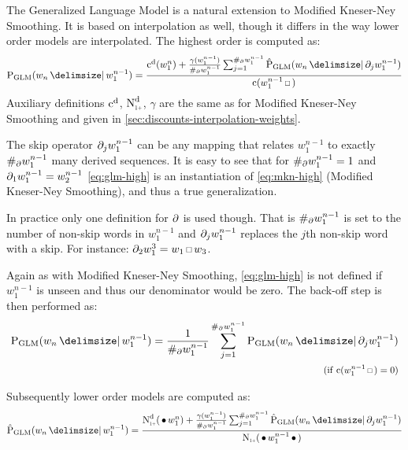 The Generalized Language Model is a natural extension to Modified Kneser-Ney
Smoothing.
It is based on interpolation as well, though it differs in the way lower order
models are interpolated.
The highest order is computed as:
\begin{equation}
  \label{eq:glm-high}
  \ProbGLM{w_n}{w_1^{n-1}} =
    \frac{\DiscountedCount(w_1^n) + \frac{\gamma(w_1^{n-1})}{\NumSkpOp{w_1^{n-1}}}
                                    \sum_{j=1}^{\NumSkpOp{w_1^{n-1}}} \ProbGLM*{w_n}{\SkpOp[j]{w_1^{n-1}}}}
         {\Count(w_1^{n-1} \Skp)}
\end{equation}
Auxiliary definitions $\DiscountedCount$, $\DiscountedCount*$, $\gamma$ are the
same as for Modified Kneser-Ney Smoothing and given in
\cref{sec:discounts-interpolation-weights}.

The skip operator $\SkpOp[j]{w_1^{n-1}}$ can be any mapping that relates
$w_1^{n-1}$ to exactly $\NumSkpOp{w_1^{n-1}}$ many derived sequences.
It is easy to see that for $\NumSkpOp{w_1^{n-1}} = 1$ and
$\SkpOp[1]{w_1^{n-1}} = w_2^{n-1}$ \cref{eq:glm-high} is an
instantiation of \cref{eq:mkn-high} (Modified Kneser-Ney Smoothing), and thus
a true generalization.

In practice only one definition for $\SkpOp$ is used though.
That is $\NumSkpOp{w_1^{n-1}}$ is set to the number of non-skip words in
$w_1^{n-1}$ and $\SkpOp[j]{w_1^{n-1}}$ replaces the $j$th non-skip word with
a skip.
For instance: $\SkpOp[2]{w_1^3} = w_1 \Skp w_3$.

Again as with Modified Kneser-Ney Smoothing, \cref{eq:glm-high} is not
defined if $w_1^{n-1}$ is unseen and thus our denominator would be zero.
The back-off step is then performed as:
\begin{equation}
  \label{eq:glm-backoff}
  \begin{split}
    \ProbGLM{w_n}{w_1^{n-1}} = \frac{1}{\NumSkpOp{w_1^{n-1}}}
                               \sum_{j=1}^{\NumSkpOp{w_1^{n-1}}} \ProbGLM{w_n}{\SkpOp[j]{w_1^{n-1}}} \\
      \hfill \Condition{\Count(w_1^{n-1} \Skp) = 0}
  \end{split}
\end{equation}

Subsequently lower order models are computed as:
\begin{equation}
  \label{eq:glm-low}
  \ProbGLM*{w_n}{w_1^{n-1}} =
    \frac{\DiscountedCount*(\WSkp w_1^n) + \frac{\gamma(w_1^{n-1})}{\NumSkpOp{w_1^{n-1}}}
                                     \sum_{j=1}^{\NumSkpOp{w_1^{n-1}}} \ProbGLM*{w_n}{\SkpOp[j]{w_1^{n-1}}}}
         {\ContCountIp(\WSkp w_1^{n-1} \WSkp)}
\end{equation}

